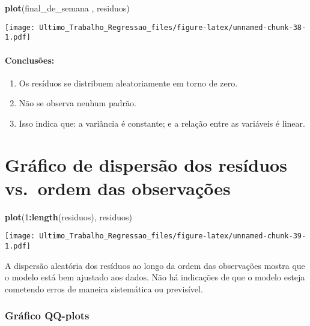 \documentclass[
]{article}
\newenvironment{Shaded}{\begin{snugshade}}{\end{snugshade}}
\newcommand{\DecValTok}[1]{\textcolor[rgb]{0.00,0.00,0.81}{#1}}
\newcommand{\FunctionTok}[1]{\textcolor[rgb]{0.13,0.29,0.53}{\textbf{#1}}}
\newcommand{\NormalTok}[1]{#1}
\newcommand{\SpecialCharTok}[1]{\textcolor[rgb]{0.81,0.36,0.00}{\textbf{#1}}}
\providecommand{\tightlist}{%
  \setlength{\itemsep}{0pt}\setlength{\parskip}{0pt}}
\begin{document}
\begin{Shaded}
\begin{Highlighting}[]
\FunctionTok{plot}\NormalTok{(final\_de\_semana , residuos)}
\end{Highlighting}
\end{Shaded}

\texttt{[image: Ultimo\_Trabalho\_Regressao\_files/figure-latex/unnamed-chunk-38-1.pdf]}

\hypertarget{conclusuxf5es-3}{%
\paragraph{Conclusões:}\label{conclusuxf5es-3}}

\begin{enumerate}
\def\labelenumi{\arabic{enumi}.}
\tightlist
\item
  Os resíduos se distribuem aleatoriamente em torno de zero.
\item
  Não se observa nenhum padrão.
\item
  Isso indica que: a variância é constante; e a relação entre as
  variáveis é linear.
\end{enumerate}

\hypertarget{gruxe1fico-de-dispersuxe3o-dos-resuxedduos-vs.-ordem-das-observauxe7uxf5es}{%
\section{Gráfico de dispersão dos resíduos vs.~ordem das
observações}\label{gruxe1fico-de-dispersuxe3o-dos-resuxedduos-vs.-ordem-das-observauxe7uxf5es}}

\begin{Shaded}
\begin{Highlighting}[]
\FunctionTok{plot}\NormalTok{(}\DecValTok{1}\SpecialCharTok{:}\FunctionTok{length}\NormalTok{(residuos), residuos)}
\end{Highlighting}
\end{Shaded}

\texttt{[image: Ultimo\_Trabalho\_Regressao\_files/figure-latex/unnamed-chunk-39-1.pdf]}

A dispersão aleatória dos resíduos ao longo da ordem das observações
mostra que o modelo está bem ajustado aos dados. Não há indicações de
que o modelo esteja cometendo erros de maneira sistemática ou
previsível.

\hypertarget{gruxe1fico-qq-plots}{%
\subsubsection{Gráfico QQ-plots}\label{gruxe1fico-qq-plots}}
\end{document}
